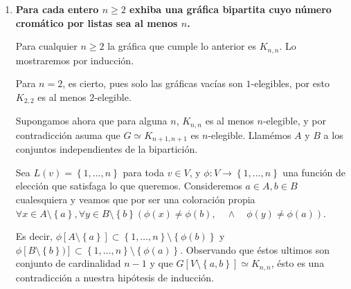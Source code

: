 \documentclass{article}
\newcommand{\set}[1]{\left\{ #1 \right\}}
\begin{document}
\begin{enumerate}
    Veamos que para cualquier cadena del orden $S_1\subset S_2\subset\dots$ el conjunto $S=\cup_{i=1}^n S_i\in\mathcal{C}$, pues si $x\in N^+(S)$ entonces existe $i\in \mathbb{N}$ tal que $x\in N^+(S_i)$, y ya que \'este \'ultimo es un semin\'ucleo tenemos que $x\in N^-(S_i)\Rightarrow x\in N^-(S)$, por lo tanto $S$ es semin\'ucleo, y entonces toda cadena tiene una cota superior en el \'orden.

    Por el Lema de Zorn, existe un \'elemento maximal de $\mathcal{C}$, llam\'emoslo (convenientemente) $K$, y supongamos que no es un n\'ucleo. Como es elemento de $\mathcal{C}$, es independiente, entonces debe existir un conjunto no vac\'io $T\subset V\setminus{K}$ tal que $T\cap N^-(K)=\emptyset$. Luego, la hip\'otesis nos asegura que tiene un semin\'ucleo no vac\'io $K'$, $K\cup K'$ es independiente por la forma en la que se defini\'o $T$ y es un semin\'ucleo pues si un v\'ertice est\'a en su exvecindad, entonces debe ser absorbido por \'el, ya que es la uni\'on de dos semin\'ucleos. As\'i, llegamos a una contradicci\'on pues hemos encontrado un elemento de $\mathcal{C}$ mayor en el orden.

    Por lo tanto, $K$ es un n\'ucleo, con \'esto hemos demostrado que $D$ es n\'ucleo perfecta.


  \item \textbf{Para cada entero $n \ge 2$ exhiba una gr\'afica bipartita cuyo n\'umero crom\'atico por listas sea al menos $n$.}

      Para cualquier $n\ge 2$ la gr\'afica que cumple lo anterior es $K_{n,n}$. Lo mostraremos por inducci\'on.

      Para $n=2$, es cierto, pues solo las gr\'aficas vac\'ias son $1$-elegibles, por esto $K_{2,2}$ es al menos $2$-elegible.

      Supongamos ahora que para alguna $n$, $K_{n,n}$ es al menos $n$-elegible, y por contradicci\'on asuma que $G\simeq K_{n+1,n+1}$ es $n$-elegible. Llam\'emos $A$ y $B$ a los conjuntos independientes de la bipartici\'on.

      Sea $L(v)=\set{1,\dots,n}$ para toda $v\in V$, y $\phi:V\to \set{1,\dots,n}$ una funci\'on de elecci\'on que satisfaga lo que queremos. Consideremos $a\in A, b\in B$ cualesquiera y veamos que por ser una coloraci\'on propia $\forall x\in A\setminus\set{a}, \forall y\in B\setminus\set{b} (\phi(x)\neq \phi(b),\quad\land\quad \phi(y)\neq\phi(a))$.


      Es decir,  $\phi[A\setminus\set{a}]\subset\set{1,\dots,n}\setminus\set{\phi(b)}$ y $\phi[B\setminus\set{b})]\subset\set{1,\dots,n}\setminus\set{\phi(a)}$. Observando que \'estos ultimos son conjunto de cardinalidad $n-1$ y que $G[V\setminus\set{a,b}]\simeq K_{n,n}$, \'esto es una contradicci\'on a nuestra hip\'otesis de inducci\'on.


\end{enumerate}
\end{document}
